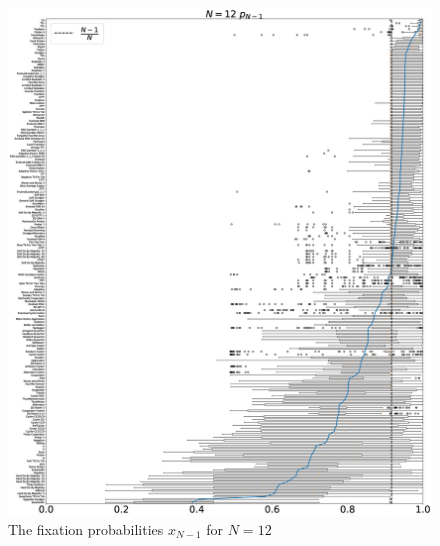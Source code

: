 \documentclass[10pt,letterpaper]{article}
\begin{document}
\begin{figure}[!hbtp]
    \centering
    \includegraphics[draft, width=\textwidth]{./Fig34.eps}
    \caption{The fixation probabilities \(x_{N-1}\) for \(N=12\)}
\end{figure}
\end{document}
